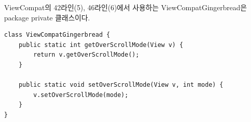 ViewCompat의 42라인(5), 46라인(6)에서 사용하는 ViewCompatGingerbread은 package private 클래스이다.
\begin{lstlisting}[frame=single]
class ViewCompatGingerbread {
    public static int getOverScrollMode(View v) {
        return v.getOverScrollMode();
    }

    public static void setOverScrollMode(View v, int mode) {
        v.setOverScrollMode(mode);
    }
}
\end{lstlisting}


